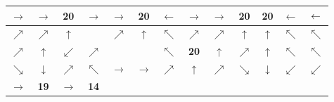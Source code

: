 \begin{center}
\begin{minipage}{\textwidth}
\renewcommand{\arraystretch}{1.35}
\begin{table}[H]
\centering 
\begin{scriptsize}
\begin{tabular}{|>{}c|>{}c|>{}c|>{}c|>{}c|>{}c|>{}c|>{}c|>{}c|>{}c|>{}c|>{}c|>{}c|}
\hline
\cellcolor{red!15!white}$\rightarrow$&\cellcolor{red!15!white}$\rightarrow$&\cellcolor{red!15!white}\bf{20}&\cellcolor{green!15!white}$\rightarrow$&\cellcolor{green!15!white}$\rightarrow$&\cellcolor{green!15!white}\bf{20}&\cellcolor{green!15!white}$\leftarrow$&\cellcolor{blue!15!white}$\rightarrow$&\cellcolor{blue!15!white}$\rightarrow$&\cellcolor{blue!15!white}\bf{20}&\cellcolor{red!15!white}\bf{20}&\cellcolor{red!15!white}$\leftarrow$&$\cellcolor{red!15!white}\leftarrow$\\
\hline
\cellcolor{red!15!white}$\nearrow$&\cellcolor{red!15!white}$\nearrow$&\cellcolor{red!15!white}$\uparrow$&\cellcolor{gray!50!white} &
\cellcolor{green!15!white}$\nearrow$&\cellcolor{green!15!white}$\uparrow$&\cellcolor{green!15!white}$\nwarrow$&\cellcolor{blue!15!white}$\nearrow$&
\cellcolor{blue!15!white}$\nearrow$&\cellcolor{blue!15!white}$\uparrow$&\cellcolor{red!15!white}$\uparrow$&\cellcolor{red!15!white}$\nwarrow$&\cellcolor{red!15!white}$\nwarrow$ \\
\hline
\cellcolor{red!15!white}$\nearrow$&\cellcolor{red!15!white}$\uparrow$&\cellcolor{blue!15!white}$\swarrow$&\cellcolor{green!15!white}$\nearrow$&
\cellcolor{gray!50!white}&\cellcolor{gray!50!white}&\cellcolor{green!15!white}$\nwarrow$ &\cellcolor{yellow!15!white}\bf{20} &\cellcolor{blue!15!white}$\uparrow$ &\cellcolor{red!15!white}$\nearrow$&\cellcolor{red!15!white}$\uparrow$ &\cellcolor{red!15!white}$\nwarrow$ &\cellcolor{red!15!white}$\nwarrow$ \\
\hline
\cellcolor{blue!15!white}$\searrow$&\cellcolor{blue!15!white}$\downarrow$&\cellcolor{green!15!white}$\nearrow$&\cellcolor{blue!15!white}$\nwarrow$&\cellcolor{yellow!15!white}
$\rightarrow$&\cellcolor{yellow!15!white}$\rightarrow$&\cellcolor{yellow!15!white}$\nearrow$&\cellcolor{yellow!15!white}$\uparrow$&\cellcolor{red!15!white}$\nearrow$ 
&\cellcolor{green!15!white}$\searrow$ &\cellcolor{green!15!white}$\downarrow$&\cellcolor{green!15!white}$\swarrow$ &\cellcolor{green!15!white}$\swarrow$ \\
\hline
\cellcolor{blue!15!white}$\rightarrow$&\cellcolor{blue!15!white}\bf{19}&\cellcolor{red!15!white}$\rightarrow$&\cellcolor{red!15!white}\bf{14}&\cellcolor{yellow!15!white}

\end{tabular}
\end{scriptsize}
\end{table}
\end{minipage}
\end{center}
